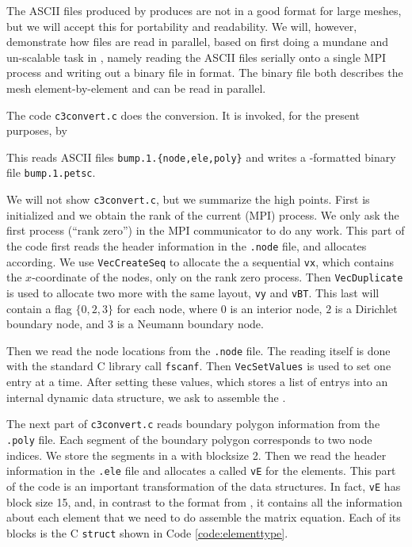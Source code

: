 The ASCII files produced by \Triangle produces are not in a good format for large meshes, but we will accept this for portability and readability.  We will, however, demonstrate how files are read in parallel, based on first doing a mundane and un-scalable task in \PETSc, namely reading the ASCII \Triangle files serially onto a single MPI process and writing out a binary file in \PETSc format.  The binary file both describes the mesh element-by-element and can be read in parallel.

The code \texttt{c3convert.c} does the conversion.  It is invoked, for the present purposes, by
This reads ASCII files \texttt{bump.1.\{node,ele,poly\}} and writes a \PETSc-formatted binary file \texttt{bump.1.petsc}.

We will not show \texttt{c3convert.c}, but we summarize the high points.  First \PETSc is initialized and we obtain the rank of the current (MPI) process.  We only ask the first process (``rank zero'') in the MPI communicator to do any work.  This part of the code first reads the header information in the \texttt{.node} file, and allocates \PETSc \pVecs according.  We use \texttt{VecCreateSeq} to allocate the a sequential \pVec \texttt{vx}, which contains the $x$-coordinate of the nodes, only on the rank zero process.  Then \texttt{VecDuplicate} is used to allocate two more \pVecs with the same layout, \texttt{vy} and \texttt{vBT}.  This last \pVec will contain a flag $\{0,2,3\}$ for each node, where $0$ is an interior node, $2$ is a Dirichlet boundary node, and $3$ is a Neumann boundary node.

Then we read the node locations from the \texttt{.node} file.  The reading itself is done with the standard C library call \texttt{fscanf}.  Then \texttt{VecSetValues} is used to set one entry at a time.  After setting these values, which stores a list of entrys into an internal \PETSc dynamic data structure, we ask \PETSc to assemble the \pVecs.

The next part of \texttt{c3convert.c} reads boundary polygon information from the \texttt{.poly} file.  Each segment of the boundary polygon corresponds to two node indices.  We store the segments in a \pVec with blocksize 2.  Then we read the header information in the \texttt{.ele} file and allocates a \pVec called \texttt{vE} for the elements.  This part of the code is an important transformation of the data structures.  In fact, \texttt{vE} has block size 15, and, in contrast to the format from \Triangle, it contains all the information about each element that we need to do assemble the matrix equation.  Each of its blocks is the C \texttt{struct} shown in Code \ref{code:elementtype}.

